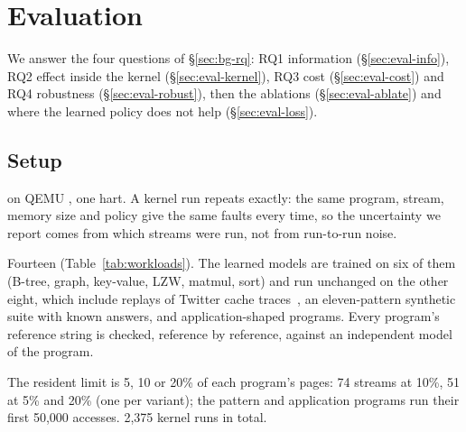 \section{Evaluation}
\label{sec:eval}

We answer the four questions of \S\ref{sec:bg-rq}: RQ1 information
(\S\ref{sec:eval-info}), RQ2 effect inside the kernel (\S\ref{sec:eval-kernel}), RQ3
cost (\S\ref{sec:eval-cost}) and RQ4 robustness (\S\ref{sec:eval-robust}), then the
ablations (\S\ref{sec:eval-ablate}) and where the learned policy does not help
(\S\ref{sec:eval-loss}).

\subsection{Setup}
\label{sec:eval-setup}

 \xv on QEMU , one hart. A kernel run repeats exactly:
the same program, stream, memory size and policy give the same faults every time, so the
uncertainty we report comes from which streams were run, not from run-to-run noise.

 Fourteen (Table~\ref{tab:workloads}). The learned models are trained
on six of them (B-tree, graph, key-value, LZW, matmul, sort) and run unchanged on the
other eight, which include replays of Twitter cache traces~\citep{yang2020twitter}, an
eleven-pattern synthetic suite with known answers, and application-shaped programs. Every
program's reference string is checked, reference by reference, against an independent
model of the program.

 The resident limit is 5, 10 or 20\% of each program's pages:
74 streams at 10\%, 51 at 5\% and 20\% (one per variant); the pattern and application
programs run their first 50,000 accesses. 2,375 kernel runs in total.


